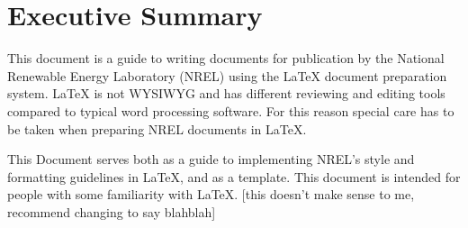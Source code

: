 \chapter*{Executive Summary}
This document is a guide to writing documents for publication by the National Renewable Energy Laboratory (NREL) using the LaTeX document preparation system. LaTeX is not WYSIWYG and has different reviewing and editing tools compared to typical word processing software. For this reason special care has to be taken when preparing NREL documents in LaTeX. 

This Document serves both as a guide to implementing NREL's style and formatting guidelines in LaTeX, and as a template. This document is intended for people with some familiarity with LaTeX. [this doesn't make sense to me, recommend changing to say blahblah]
